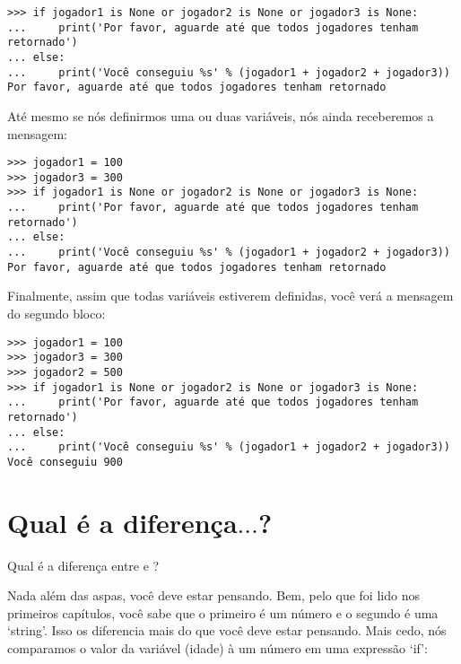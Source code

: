 \begin{listing}
\begin{verbatim}
>>> if jogador1 is None or jogador2 is None or jogador3 is None:
...     print('Por favor, aguarde até que todos jogadores tenham retornado')
... else:
...     print('Você conseguiu %s' % (jogador1 + jogador2 + jogador3))
Por favor, aguarde até que todos jogadores tenham retornado
\end{verbatim}
\end{listing}

Até mesmo se nós definirmos uma ou duas variáveis, nós ainda receberemos a mensagem:

\begin{listing}
\begin{verbatim}
>>> jogador1 = 100
>>> jogador3 = 300
>>> if jogador1 is None or jogador2 is None or jogador3 is None:
...     print('Por favor, aguarde até que todos jogadores tenham retornado')
... else:
...     print('Você conseguiu %s' % (jogador1 + jogador2 + jogador3))
Por favor, aguarde até que todos jogadores tenham retornado
\end{verbatim}
\end{listing}

\noindent
Finalmente, assim que todas variáveis estiverem definidas, você verá a mensagem do segundo bloco:

\begin{listing}
\begin{verbatim}
>>> jogador1 = 100
>>> jogador3 = 300
>>> jogador2 = 500
>>> if jogador1 is None or jogador2 is None or jogador3 is None:
...     print('Por favor, aguarde até que todos jogadores tenham retornado')
... else:
...     print('Você conseguiu %s' % (jogador1 + jogador2 + jogador3))
Você conseguiu 900
\end{verbatim}
\end{listing}

\section{Qual é a diferença$\ldots$?}\label{whatsthedifference}

Qual é a diferença entre  e ?
\par
Nada além das aspas, você deve estar pensando. Bem, pelo que foi lido nos primeiros capítulos, você sabe que o primeiro é um número e o segundo é uma `string'. Isso os diferencia mais do que você deve estar pensando. Mais cedo, nós comparamos o valor da variável (idade) à um número em uma expressão `if':

